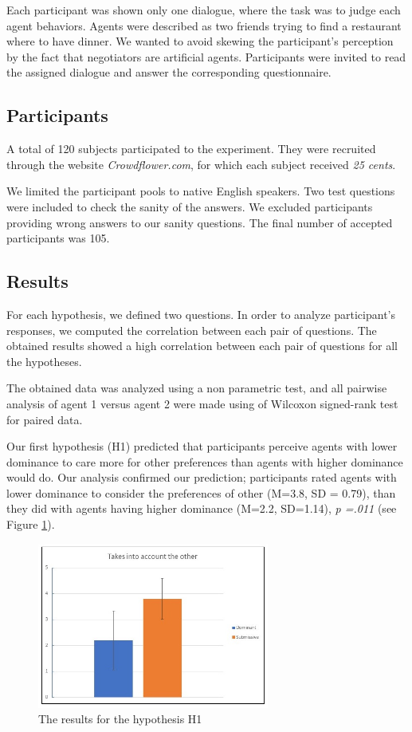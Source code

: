 \documentclass{llncs}
\begin{document}
		Each participant was shown only one dialogue, where the task was to judge each agent behaviors. Agents were described as two friends trying to find a restaurant where to have dinner. We wanted to avoid skewing the participant's perception by the fact that negotiators are artificial agents. Participants were invited to read the assigned dialogue and answer the corresponding questionnaire. 
		
		\subsection{Participants}
		A total of 120 subjects participated to the experiment. They were recruited through the website \emph{Crowdflower.com}, for which each subject received \textit{25 cents}. 
		
		
		We limited the participant pools to native English speakers. Two test questions were included to check the sanity of the answers. We excluded participants providing wrong answers to our sanity questions. The final number of accepted participants was 105. 
		
		\subsection{Results}
		For each hypothesis, we defined two questions. In order to analyze participant's responses, we computed the correlation between each pair of questions. The obtained results showed a high correlation between each pair of questions for all the hypotheses.
		
		The obtained data was analyzed using a non parametric test, and all pairwise analysis of agent 1 versus agent 2 were made using of Wilcoxon signed-rank test for paired data. 
		
		\par Our first hypothesis (H1) predicted that participants perceive agents with lower dominance  to care more for other preferences than agents with higher dominance would do. Our analysis confirmed our prediction; participants rated agents with lower dominance to consider the preferences of other (M=3.8, SD = 0.79), than they did with agents having higher dominance (M=2.2, SD=1.14), \emph{p =.011} (see Figure \ref{considerOther}).
					\begin{figure}[h]
						\centering
						\caption{\label{considerOther} The results for the  hypothesis H1}
						\includegraphics[width=3in]{plots/considerOther}
					\end{figure}
		
\end{document}
